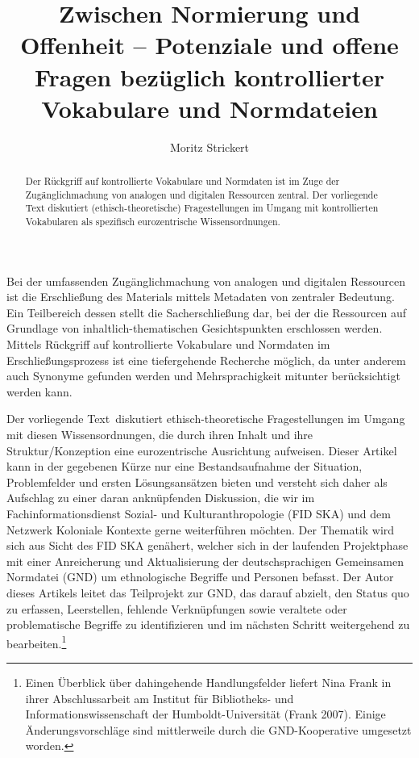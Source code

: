 \documentclass[a4paper,
fontsize=11pt,
oneside,
numbers=noperiodatend,
parskip=half-,
bibliography=totoc,
final
]{scrartcl}
\title{\LARGE{Zwischen Normierung und Offenheit -- Potenziale und offene Fragen bezüglich kontrollierter Vokabulare und Normdateien}}%
\author{Moritz Strickert} %
\date{}
\begin{document}
\maketitle
\thispagestyle{fancyplain} 

\begin{abstract}
\noindent
Der Rückgriff auf kontrollierte Vokabulare und Normdaten
ist im Zuge der Zugänglichmachung von analogen und digitalen Ressourcen
zentral. Der vorliegende Text diskutiert (ethisch-theoretische)
Fragestellungen im Umgang mit kontrollierten Vokabularen als spezifisch
eurozentrische Wissensordnungen.
\end{abstract}

Bei der umfassenden Zugänglichmachung von analogen und digitalen
Ressourcen ist die Erschließung des Materials mittels Metadaten von
zentraler Bedeutung. Ein Teilbereich dessen stellt die Sacherschließung
dar, bei der die Ressourcen auf Grundlage von inhaltlich-thema\-tischen
Gesichtspunkten erschlossen werden. Mittels Rückgriff auf kontrollierte
Vokabulare und Normdaten im Erschließungsprozess ist eine tiefergehende
Recherche möglich, da unter anderem auch Synonyme gefunden werden und
Mehrsprachigkeit mitunter berücksichtigt werden kann.

Der vorliegende Text~diskutiert ethisch-theoretische Fragestellungen im
Umgang mit diesen Wissensordnungen, die durch ihren Inhalt und ihre
Struktur/Konzeption eine eurozentrische Ausrichtung aufweisen. Dieser
Artikel kann in der gegebenen Kürze nur eine Bestandsaufnahme der
Situation, Problemfelder und ersten Lösungsansätzen bieten und versteht
sich daher als Aufschlag zu einer daran anknüpfenden Diskussion, die wir
im Fachinformationsdienst Sozial- und Kulturanthropologie (FID SKA) und
dem Netzwerk Koloniale Kontexte gerne weiterführen möchten. Der Thematik
wird sich aus Sicht des FID SKA genähert, welcher sich in der laufenden
Projektphase mit einer Anreicherung und Aktualisierung der
deutschsprachigen Gemeinsamen Normdatei (GND) um ethnologische Begriffe
und Personen befasst. Der Autor dieses Artikels leitet das Teilprojekt
zur GND, das darauf abzielt, den Status quo zu erfassen, Leerstellen,
fehlende Verknüpfungen sowie veraltete oder problematische Begriffe zu
identifizieren und im nächsten Schritt weitergehend zu
bearbeiten.\footnote{Einen Überblick über dahingehende Handlungsfelder
  liefert Nina Frank in ihrer Abschlussarbeit am Institut für
  Bibliotheks- und Informationswissenschaft der Humboldt-Universität
  (Frank 2007). Einige Änderungsvorschläge sind mittlerweile durch die
  GND-Kooperative umgesetzt worden.}
\end{document}
